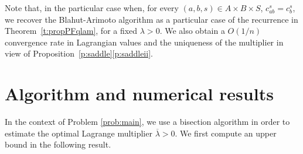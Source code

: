 \documentclass[smallextended,referee,envcountsect,]{svjour3}
\begin{document}
\begin{remark}
Note that, in the particular case when, for every $(a,b,s)\in 
{A\times 
B\times S}$, $c_{ab}^s=c_b^s$, we recover the Blahut-Arimoto 
algorithm as a particular case of the recurrence in 
Theorem~\ref{t:propPFqlam}, for a fixed $\lambda>0$.
We also obtain a $O(1/n)$ {convergence} rate in 
Lagrangian values {and the uniqueness of the multiplier in 
view of Proposition~\ref{p:saddle}\eqref{p:saddleii}.}
\end{remark}


\section{Algorithm and numerical results}

In the context of Problem \ref{prob:main}, we use a bisection 
algorithm in order to estimate the optimal Lagrange multiplier 
$\overline{\lambda}>0$. 
We first compute an upper 
bound {in the following result}.
\end{document}
